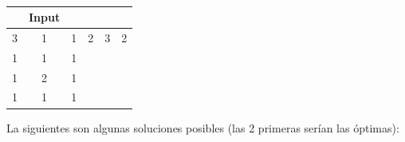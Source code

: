 \documentclass[11pt, a4paper, twoside]{article}
\begin{document}
\begin{samepage}

\begin{ejemplo}\hspace{0em} \\
    \begin{center}
	\begin{minipage}{0.4\textwidth}
			\begin{tabular}{cccccc}
			 & Input \\
			   \hline
			   3 & 1 & 1 & 2 & 3 & 2\\
			   1 & 1 & 1 &   &   &  \\
			   1 & 2 & 1 &   &   &  \\
			   1 & 1 & 1 &   &   &  \\
			\end{tabular}
	\end{minipage}
	\end{center}
	
La siguientes son algunas soluciones posibles (las 2 primeras serían las óptimas): \\	


\end{ejemplo}
\end{samepage}
\end{document}
